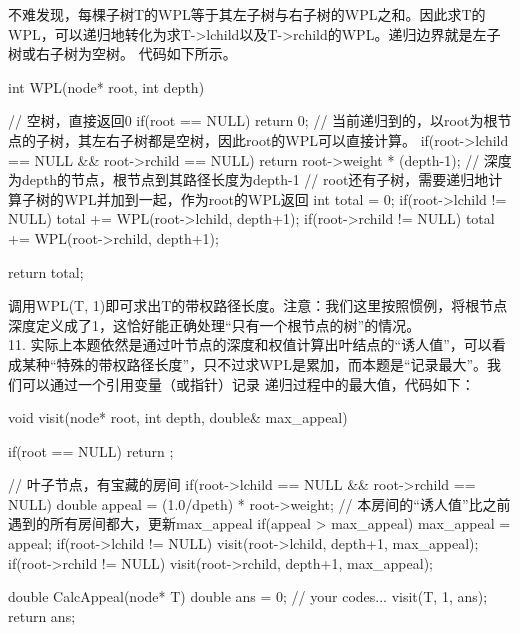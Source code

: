     不难发现，每棵子树T的WPL等于其左子树与右子树的WPL之和。因此求T的WPL，可以递归地转化为求T->lchild以及T->rchild的WPL。递归边界就是左子树或右子树为空树。
    代码如下所示。
    \begin{cppcode}
        int WPL(node* root, int depth) {
            // 空树，直接返回0
            if(root == NULL) return 0;
            // 当前递归到的，以root为根节点的子树，其左右子树都是空树，因此root的WPL可以直接计算。
            if(root->lchild == NULL && root->rchild == NULL) {
                return root->weight * (depth-1);    // 深度为depth的节点，根节点到其路径长度为depth-1
            }
            // root还有子树，需要递归地计算子树的WPL并加到一起，作为root的WPL返回
            int total = 0;
            if(root->lchild != NULL) {
                total += WPL(root->lchild, depth+1);
            }
            if(root->rchild != NULL) {
                total += WPL(root->rchild, depth+1);
            }

            return total;
        }
    \end{cppcode}
    调用WPL(T, 1)即可求出T的带权路径长度。注意：我们这里按照惯例，将根节点深度定义成了1，这恰好能正确处理“只有一个根节点的树”的情况。\\

    11. 实际上本题依然是通过叶节点的深度和权值计算出叶结点的“诱人值”，可以看成某种“特殊的带权路径长度”，只不过求WPL是累加，而本题是“记录最大”。我们可以通过一个引用变量（或指针）记录
    递归过程中的最大值，代码如下：
    \begin{cppcode}

        void visit(node* root, int depth, double& max_appeal) {
            if(root == NULL) return ;

            // 叶子节点，有宝藏的房间
            if(root->lchild == NULL && root->rchild == NULL) {
                double appeal = (1.0/dpeth) * root->weight;
                // 本房间的“诱人值”比之前遇到的所有房间都大，更新max_appeal
                if(appeal > max_appeal) {
                    max_appeal = appeal;
                }
            }
            if(root->lchild != NULL) {
                visit(root->lchild, depth+1, max_appeal);
            }
            if(root->rchild != NULL) {
                visit(root->rchild, depth+1, max_appeal);
            }

        }

        double CalcAppeal(node* T) {
            double ans = 0;
            // your codes...
            visit(T, 1, ans);
            return ans;
        }
    \end{cppcode}
    \vspace{\baselineskip}

